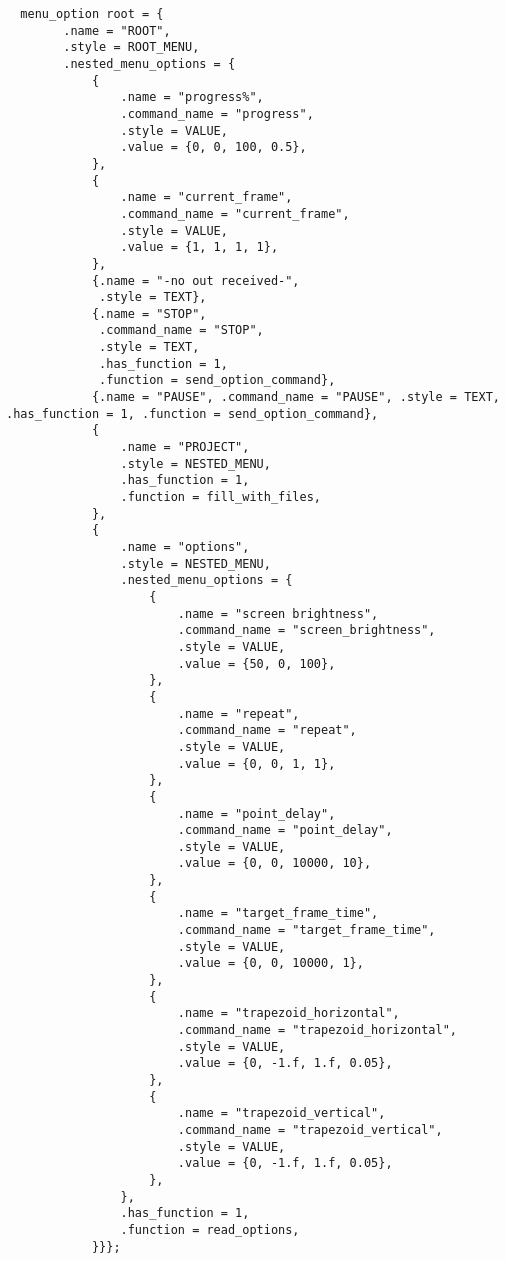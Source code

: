 \begin{verbatim}
  menu_option root = {
        .name = "ROOT",
        .style = ROOT_MENU,
        .nested_menu_options = {
            {
                .name = "progress%",
                .command_name = "progress",
                .style = VALUE,
                .value = {0, 0, 100, 0.5},
            },
            {
                .name = "current_frame",
                .command_name = "current_frame",
                .style = VALUE,
                .value = {1, 1, 1, 1},
            },
            {.name = "-no out received-",
             .style = TEXT},
            {.name = "STOP",
             .command_name = "STOP",
             .style = TEXT,
             .has_function = 1,
             .function = send_option_command},
            {.name = "PAUSE", .command_name = "PAUSE", .style = TEXT, .has_function = 1, .function = send_option_command},
            {
                .name = "PROJECT",
                .style = NESTED_MENU,
                .has_function = 1,
                .function = fill_with_files,
            },
            {
                .name = "options",
                .style = NESTED_MENU,
                .nested_menu_options = {
                    {
                        .name = "screen brightness",
                        .command_name = "screen_brightness",
                        .style = VALUE,
                        .value = {50, 0, 100},
                    },
                    {
                        .name = "repeat",
                        .command_name = "repeat",
                        .style = VALUE,
                        .value = {0, 0, 1, 1},
                    },
                    {
                        .name = "point_delay",
                        .command_name = "point_delay",
                        .style = VALUE,
                        .value = {0, 0, 10000, 10},
                    },
                    {
                        .name = "target_frame_time",
                        .command_name = "target_frame_time",
                        .style = VALUE,
                        .value = {0, 0, 10000, 1},
                    },
                    {
                        .name = "trapezoid_horizontal",
                        .command_name = "trapezoid_horizontal",
                        .style = VALUE,
                        .value = {0, -1.f, 1.f, 0.05},
                    },
                    {
                        .name = "trapezoid_vertical",
                        .command_name = "trapezoid_vertical",
                        .style = VALUE,
                        .value = {0, -1.f, 1.f, 0.05},
                    },
                },
                .has_function = 1,
                .function = read_options,
            }}};
\end{verbatim}

